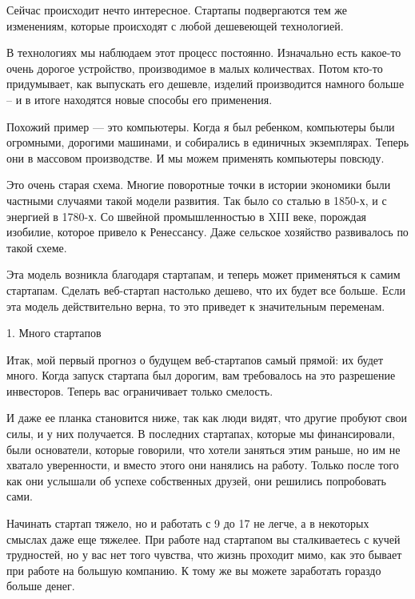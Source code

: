 \documentclass[ebook,12pt,oneside,openany]{memoir}
\date{}
\begin{document}
\maketitle

Сейчас происходит нечто интересное. Стартапы подвергаются тем же
изменениям, которые происходят с любой дешевеющей технологией.

В технологиях мы наблюдаем этот процесс постоянно. Изначально есть
какое-то очень дорогое устройство, производимое в малых количествах.
Потом кто-то придумывает, как выпускать его дешевле, изделий
производится намного больше -- и в итоге находятся новые способы его
применения.

Похожий пример — это компьютеры. Когда я был ребенком, компьютеры были
огромными, дорогими машинами, и собирались в единичных экземплярах.
Теперь они в массовом производстве. И мы можем применять компьютеры
повсюду.

Это очень старая схема. Многие поворотные точки в истории экономики
были частными случаями такой модели развития. Так было со сталью в
1850-х, и с энергией в 1780-х. Со швейной промышленностью в XIII веке,
порождая изобилие, которое привело к Ренессансу. Даже сельское
хозяйство развивалось по такой схеме.

Эта модель возникла благодаря стартапам, и теперь может применяться к
самим стартапам. Сделать веб-стартап настолько дешево, что их будет
все больше. Если эта модель действительно верна, то это приведет к
значительным переменам.

1. Много стартапов

Итак, мой первый прогноз о будущем веб-стартапов самый прямой: их
будет много. Когда запуск стартапа был дорогим, вам требовалось на это
разрешение инвесторов. Теперь вас ограничивает только смелость.

И даже ее планка становится ниже, так как люди видят, что другие
пробуют свои силы, и у них получается. В последних стартапах, которые
мы финансировали, были основатели, которые говорили, что хотели
заняться этим раньше, но им не хватало уверенности, и вместо этого они
нанялись на работу. Только после того как они услышали об успехе
собственных друзей, они решились попробовать сами.

Начинать стартап тяжело, но и работать с 9 до 17 не легче, а в
некоторых смыслах даже еще тяжелее. При работе над стартапом вы
сталкиваетесь с кучей трудностей, но у вас нет того чувства, что жизнь
проходит мимо, как это бывает при работе на большую компанию. К тому
же вы можете заработать гораздо больше денег.
\end{document}
